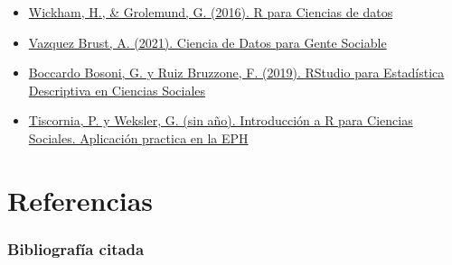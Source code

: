 \documentclass[
]{article}
\begin{document}
\begin{itemize}
\item
  \href{https://es.r4ds.hadley.nz/}{Wickham, H., \& Grolemund, G. (2016). R para Ciencias de datos}
\item
  \href{https://bitsandbricks.github.io/ciencia_de_datos_gente_sociable/}{Vazquez Brust, A. (2021). Ciencia de Datos para Gente Sociable}
\item
  \href{https://bookdown.org/gboccardo/manual-ED-UCH/}{Boccardo Bosoni, G. y Ruiz Bruzzone, F. (2019). RStudio para Estadística Descriptiva en Ciencias Sociales}
\item
  \href{https://guidowe.github.io/Curso-R-Flacso/}{Tiscornia, P. y Weksler, G. (sin año). Introducción a R para Ciencias Sociales. Aplicación practica en la EPH}
\end{itemize}

\hypertarget{part-referencias}{%
\part{Referencias}\label{part-referencias}}

\hypertarget{bibliografuxeda-citada}{%
\section*{Bibliografía citada}\label{bibliografuxeda-citada}}
\end{document}
